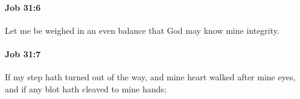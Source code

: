 		\paragraph{Job 31:6} %
			\label{JOB-31-6}

			Let me be weighed in an even balance that God may know mine integrity.


		\paragraph{Job 31:7} %
			\label{JOB-31-7}

			If my step hath turned out of the way, and mine heart walked after mine eyes, and if any blot hath cleaved to mine hands;


